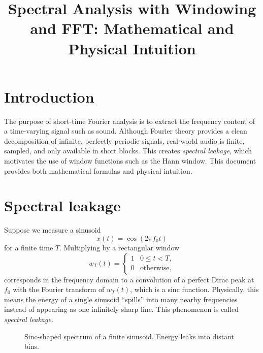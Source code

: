 \documentclass[11pt]{article}
\title{Spectral Analysis with Windowing and FFT: Mathematical and Physical Intuition}
\author{}
\date{}
\begin{document}
\maketitle

\section*{Introduction}
The purpose of short-time Fourier analysis is to extract the frequency content of a time-varying signal
such as sound. Although Fourier theory provides a clean decomposition of infinite, perfectly periodic
signals, real-world audio is finite, sampled, and only available in short blocks. This creates
\emph{spectral leakage}, which motivates the use of window functions such as the Hann window. This
document provides both mathematical formulas and physical intuition.

\section*{Spectral leakage}
Suppose we measure a sinusoid
\begin{equation}
    x(t)=\cos(2\pi f_0 t)
\end{equation}
for a finite time $T$. Multiplying by a rectangular window
\begin{equation}
    w_T(t)=
    \begin{cases}
        1 & 0\le t<T,         \\
        0 & \text{otherwise},
    \end{cases}
\end{equation}
corresponds in the frequency domain to a convolution of a perfect Dirac peak at $f_0$ with the
Fourier transform of $w_T(t)$, which is a sinc function. Physically, this means the energy of a
single sinusoid ``spills'' into many nearby frequencies instead of appearing as one infinitely sharp
line. This phenomenon is called \emph{spectral leakage}.

\begin{figure}[h]
    \centering
    \caption{Sinc-shaped spectrum of a finite sinusoid. Energy leaks into distant bins.}
\end{figure}
\end{document}
